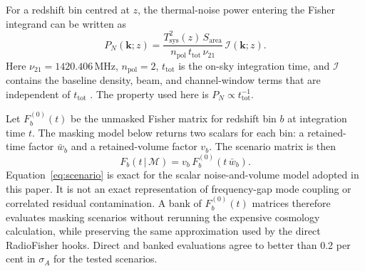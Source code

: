 For a redshift bin centred at $z$, the thermal-noise power entering the
Fisher integrand can be written as
\begin{equation}
\label{eq:noise}
P_N(\mathbf{k};z) =
\frac{T_\mathrm{sys}^2(z)\,S_\mathrm{area}}
     {n_\mathrm{pol}\,t_\mathrm{tot}\,\nu_{21}}\,
\mathcal{I}(\mathbf{k};z).
\end{equation}
Here $\nu_{21}=1420.406$\,MHz, $n_\mathrm{pol}=2$, $t_\mathrm{tot}$ is
the on-sky integration time, and $\mathcal{I}$ contains the baseline
density, beam, and channel-window terms that are independent of
$t_\mathrm{tot}$ \citep[Eq.~A9]{CHIMEOverview2022}. The property used
here is $P_N\propto t_\mathrm{tot}^{-1}$.

Let $F_b^{(0)}(t)$ be the unmasked Fisher matrix for redshift bin $b$ at
integration time $t$. The masking model below returns two scalars for
each bin: a retained-time factor $\bar{w}_b$ and a retained-volume
factor $v_b$. The scenario matrix is then
\begin{equation}
\label{eq:scenario}
F_b(t\,|\,\mathcal{M}) = v_b\,F_b^{(0)}(t\,\bar{w}_b).
\end{equation}
Equation~\eqref{eq:scenario} is exact for the scalar noise-and-volume
model adopted in this paper. It is not an exact representation of
frequency-gap mode coupling or correlated residual contamination. A
bank of $F_b^{(0)}(t)$ matrices therefore evaluates masking scenarios
without rerunning the expensive cosmology calculation, while preserving
the same approximation used by the direct RadioFisher hooks. Direct and
banked evaluations agree to better than 0.2 per cent in $\sigma_A$ for
the tested scenarios.

